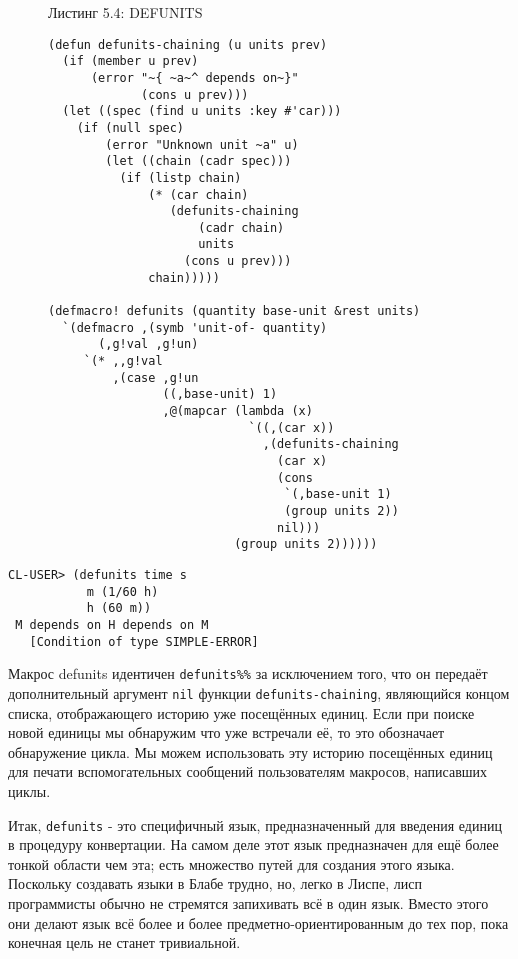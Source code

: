 \begin{figure}Листинг 5.4: DEFUNITS\label{listing_5.4}
\listbegin
\begin{verbatim}
(defun defunits-chaining (u units prev)
  (if (member u prev)
      (error "~{ ~a~^ depends on~}"
             (cons u prev)))
  (let ((spec (find u units :key #'car)))
    (if (null spec)
        (error "Unknown unit ~a" u)
        (let ((chain (cadr spec)))
          (if (listp chain)
              (* (car chain)
                 (defunits-chaining
                     (cadr chain)
                     units
                   (cons u prev)))
              chain)))))

(defmacro! defunits (quantity base-unit &rest units)
  `(defmacro ,(symb 'unit-of- quantity)
       (,g!val ,g!un)
     `(* ,,g!val
         ,(case ,g!un
                ((,base-unit) 1)
                ,@(mapcar (lambda (x)
                            `((,(car x))
                              ,(defunits-chaining
                                (car x)
                                (cons
                                 `(,base-unit 1)
                                 (group units 2))
                                nil)))
                          (group units 2))))))
\end{verbatim}
\listend
\end{figure}

\begin{verbatim}
CL-USER> (defunits time s
           m (1/60 h)
           h (60 m))
 M depends on H depends on M
   [Condition of type SIMPLE-ERROR]
\end{verbatim}

Макрос defunits идентичен \verb"defunits%%" за исключением того, что он передаёт дополнительный аргумент \verb"nil" функции \verb"defunits-chaining", являющийся концом списка, отображающего историю уже посещённых единиц. Если при поиске новой единицы мы обнаружим что уже встречали её, то это обозначает обнаружение цикла. Мы можем использовать эту историю посещённых единиц для печати вспомогательных сообщений пользователям макросов, написавших циклы.

Итак, \verb"defunits" - это специфичный язык, предназначенный для введения единиц в процедуру конвертации. На самом деле этот язык предназначен для ещё более тонкой области чем эта; есть множество путей для создания этого языка. Поскольку создавать языки в Блабе трудно, но, легко в Лиспе, лисп программисты обычно не стремятся запихивать всё в один язык. Вместо этого они делают язык всё более и более предметно-ориентированным до тех пор, пока конечная цель не станет тривиальной.

